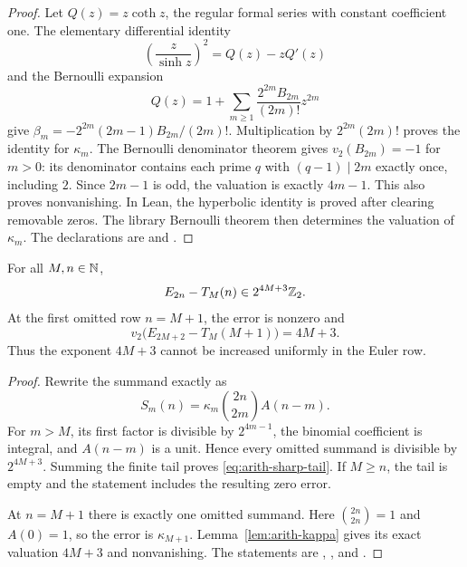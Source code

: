 \begin{proof}
Let $Q(z)=z\coth z$, the regular formal series with constant coefficient
one.  The elementary differential identity
\[
 \left(\frac z{\sinh z}\right)^2=Q(z)-zQ'(z)
\]
and the Bernoulli expansion
\[
 Q(z)=1+\sum_{m\ge1}\frac{2^{2m}B_{2m}}{(2m)!}z^{2m}
\]
give
$\beta_m=-2^{2m}(2m-1)B_{2m}/(2m)!$.
Multiplication by $2^{2m}(2m)!$ proves the identity for $\kappa_m$.
The Bernoulli denominator theorem gives $v_2(B_{2m})=-1$ for $m>0$: its denominator contains each prime $q$ with $(q-1)\mid 2m$ exactly once, including $2$\cite{DLMF24}.
Since $2m-1$ is odd, the valuation is exactly $4m-1$.
This also proves nonvanishing.  In Lean, the hyperbolic identity is proved
after clearing removable zeros.  The library Bernoulli theorem then
determines the valuation of $\kappa_m$.
The declarations are
 and
.
\end{proof}

\begin{theorem}\label{thm:arith-sharp-tower}
For all $M,n\in\mathbb N$,
\begin{equation}\label{eq:arith-sharp-tail}
 E_{2n}-T_M(n)\in2^{4M+3}\mathbb Z_2.
\end{equation}
At the first omitted row $n=M+1$, the error is nonzero and
\[
 v_2\bigl(E_{2M+2}-T_M(M+1)\bigr)=4M+3.
\]
Thus the exponent $4M+3$ cannot be increased uniformly in the Euler row.
\end{theorem}

\begin{proof}
Rewrite the summand exactly as
\[
 S_m(n)=\kappa_m\binom{2n}{2m}A(n-m).
\]
For $m>M$, its first factor is divisible by $2^{4m-1}$, the binomial
coefficient is integral, and $A(n-m)$ is a unit.  Hence every omitted
summand is divisible by $2^{4M+3}$.  Summing the finite tail proves
\eqref{eq:arith-sharp-tail}.  If $M\ge n$, the tail is empty and the
statement includes the resulting zero error.

At $n=M+1$ there is exactly one omitted summand.  Here
$\binom{2n}{2n}=1$ and $A(0)=1$, so the error is $\kappa_{M+1}$.
Lemma~\ref{lem:arith-kappa} gives its exact valuation $4M+3$ and
nonvanishing.  The statements are
,
, and
.
\end{proof}

